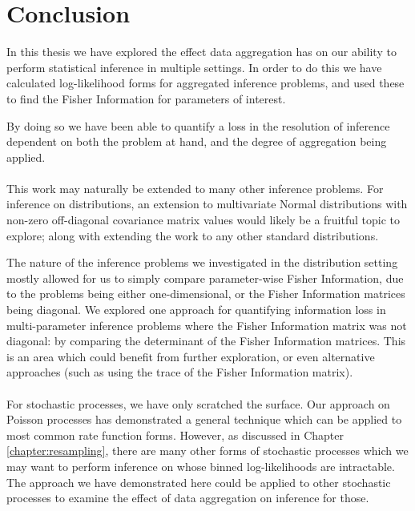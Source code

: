 \documentclass[11pt,a4,twosided,singlespacing,titlepagenumber=on,numbers=endperiod]{scrreprt}
\numberwithin{equation}{chapter} %
\theoremstyle{remark}
\begin{document}
\chapter{Conclusion}
In this thesis we have explored the effect data aggregation has on our ability to perform statistical inference in multiple settings. In order to do this we have calculated log-likelihood forms for aggregated inference problems, and used these to find the Fisher Information for parameters of interest.

By doing so we have been able to quantify a loss in the resolution of inference dependent on both the problem at hand, and the degree of aggregation being applied. \\\\
This work may naturally be extended to many other inference problems. For inference on distributions, an extension to multivariate Normal distributions with non-zero off-diagonal covariance matrix values would likely be a fruitful topic to explore; along with extending the work to any other standard distributions.

The nature of the inference problems we investigated in the distribution setting mostly allowed for us to simply compare parameter-wise Fisher Information, due to the problems being either one-dimensional, or the Fisher Information matrices being diagonal. We explored one approach for quantifying information loss in multi-parameter inference problems where the Fisher Information matrix was not diagonal: by comparing the determinant of the Fisher Information matrices. This is an area which could benefit from further exploration, or even alternative approaches (such as using the trace of the Fisher Information matrix). \\\\
For stochastic processes, we have only scratched the surface. Our approach on Poisson processes has demonstrated a general technique which can be applied to most common rate function forms. However, as discussed in Chapter \ref{chapter:resampling}, there are many other forms of stochastic processes which we may want to perform inference on whose binned log-likelihoods are intractable. The approach we have demonstrated here could be applied to other stochastic processes to examine the effect of data aggregation on inference for those.
\end{document}

